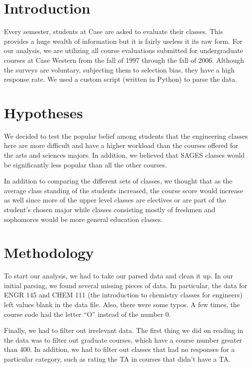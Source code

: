 \documentclass[12pt]{article}
\begin{document}
\maketitle

\section{Introduction}
Every semester, students at Case are asked to evaluate their classes. This provides a huge wealth of information but it is fairly useless it its raw form. For our analysis, we are utilizing all course evaluations submitted for undergraduate courses at Case Western from the fall of 1997 through the fall of 2006.  Although the surveys are voluntary, subjecting them to selection bias, they have a high response rate. We used a custom script (written in Python) to parse the data.

\section{Hypotheses}
We decided to test the popular belief among students that the engineering classes here are more difficult and have a higher workload than the courses offered for the arts and sciences majors. In addition, we believed that SAGES classes would be significantly less popular than all the other courses.

In addition to comparing the different sets of classes, we thought that as the average class standing of the students increased, the course score would increase as well since more of the upper level classes are electives or are part of the student's chosen major while classes consisting mostly of freshmen and sophomores would be more general education classes.

\section{Methodology}
To start our analysis, we had to take our parsed data and clean it up. In our initial parsing, we found several missing pieces of data. In particular, the data for ENGR 145 and CHEM 111 (the introduction to chemistry classes for engineers) left values blank in the data file. Also, there were some typos. A few times, the course code had the letter ``O'' instead of the number 0.

Finally, we had to filter out irrelevant data. The first thing we did on reading in the data was to filter out graduate courses, which have a course number greater than 400. In addition, we had to filter out classes that had no responses for a particular category, such as rating the TA in courses that didn't have a TA. 
\end{document}
